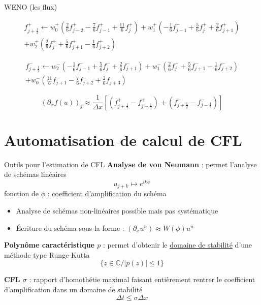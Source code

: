 \documentclass{beamer}
\begin{document}
\begin{frame}{WENO (les flux)}

  $$
    \begin{aligned}
      f_{j+\frac{1}{2}}^+ \gets w_0^+ \left( \frac{2}{6}f^+_{j-2} - \frac{7}{6}f^+_{j-1} + \frac{11}{6}f^+_{j}\right)
                              + w_1^+ \left(-\frac{1}{6}f^+_{j-1} + \frac{5}{6}f^+_{j}   +  \frac{2}{6}f^+_{j+1}\right) \\
                              + w_2^+ \left( \frac{2}{6}f^+_{j}   + \frac{5}{6}f^+_{j+1} -  \frac{1}{6}f^+_{j+2}\right)
    \end{aligned}
  $$

  $$
    \begin{aligned}
      f_{j+\frac{1}{2}}^- \gets w_2^- \left(-\frac{1}{6}f^-_{j-1} + \frac{5}{6}f^-_{j}   + \frac{2}{6}f^-_{j+1}\right)
                              + w_1^- \left( \frac{2}{6}f^-_{j}   + \frac{5}{6}f^-_{j+1} - \frac{1}{6}f^-_{j+2}\right) \\
                              + w_0^- \left(\frac{11}{6}f^-_{j+1} - \frac{7}{6}f^-_{j+2} + \frac{2}{6}f^-_{j+3}\right)
    \end{aligned}
  $$

  $$
  \boxed{
    (\partial_x f(u))_j \approx \frac{1}{\Delta x}\left[(f_{j+\frac{1}{2}}^+ - f_{j-\frac{1}{2}}^+) + (f_{j+\frac{1}{2}}^- - f_{j-\frac{1}{2}}^-)\right]
    }
  $$
\end{frame}


\section{Automatisation de calcul de CFL}
\begin{frame}{Outils pour l'estimation de CFL}
  \textbf{Analyse de von Neumann} : permet l'analyse de schémas linéaires $$u_{j+k} \mapsto e^{ik\phi}$$ fonction de $\phi$ : \underline{coefficient d'amplification} du schéma \begin{itemize}
    \item Analyse de schémas non-linéaires possible mais pas systématique
    \item Écriture du schéma sous la forme : $(\partial_x u^n) \approx W(\phi)u^n$
  \end{itemize}

  \textbf{Polynôme caractéristique $p$} : permet d'obtenir le \underline{domaine de stabilité} d'une méthode type Runge-Kutta $$\{z\in\mathbb{C}/ |p(z)| \leq 1 \}$$

  \textbf{CFL $\sigma$} : rapport d’homothétie maximal faisant entièrement rentrer le coefficient d'amplification dans un domaine de stabilité $$\Delta t \leq \sigma \Delta x$$
\end{frame}
\end{document}
